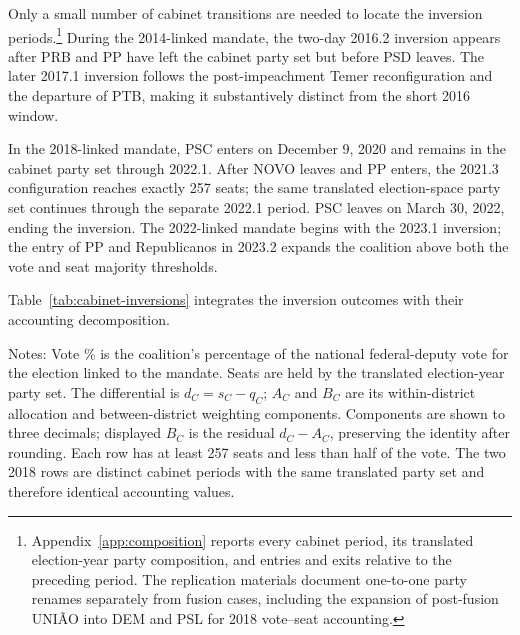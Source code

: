 \documentclass[11pt]{article}
\begin{document}
Only a small number of cabinet transitions are needed to locate the inversion
periods.\footnote{Appendix~\ref{app:composition} reports every cabinet period,
  its translated election-year party composition, and entries and exits relative
  to the preceding period. The replication materials document one-to-one party
  renames separately from fusion cases, including the expansion of
  post-fusion UNIÃO into DEM and PSL for 2018 vote--seat accounting.}
During the 2014-linked mandate, the two-day 2016.2 inversion appears after PRB
and PP have left the cabinet party set but before PSD leaves. The later 2017.1
inversion follows the post-impeachment Temer reconfiguration and the departure
of PTB, making it substantively distinct from the short 2016 window.

In the 2018-linked mandate, PSC enters on December 9, 2020 and remains in the
cabinet party set through 2022.1. After NOVO leaves and PP enters, the 2021.3
configuration reaches exactly 257 seats; the same translated election-space
party set continues through the separate 2022.1 period. PSC leaves on March 30,
2022, ending the inversion. The 2022-linked mandate begins with the 2023.1
inversion; the entry of PP and Republicanos in 2023.2 expands the coalition
above both the vote and seat majority thresholds.

Table~\ref{tab:cabinet-inversions} integrates the inversion outcomes with their
accounting decomposition.

\begin{table}[htbp]
\centering
\caption{Observed cabinet-period coalition inversions and accounting components}
\label{tab:cabinet-inversions}
\footnotesize
\setlength{\tabcolsep}{2pt}
\renewcommand{\arraystretch}{1.06}

\begin{flushleft}
  \footnotesize Notes: Vote \% is the coalition's percentage of the national
  federal-deputy vote for the election linked to the mandate. Seats are held by
  the translated election-year party set. The differential is
  \(d_C=s_C-q_C\); \(A_C\) and \(B_C\) are its within-district allocation and
  between-district weighting components. Components are shown to three
  decimals; displayed \(B_C\) is the residual \(d_C-A_C\), preserving the
  identity after rounding. Each row has at least 257 seats and less than half
  of the vote. The two 2018 rows are distinct cabinet periods
  with the same translated party set and therefore identical accounting values.
\end{flushleft}
\end{table}
\end{document}
